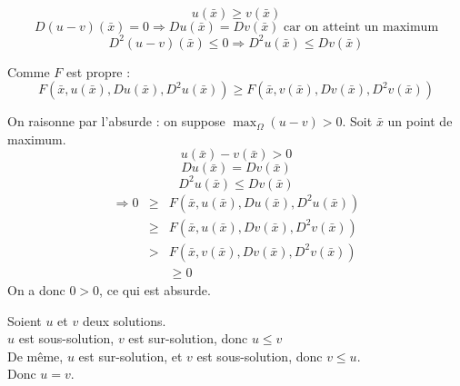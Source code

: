 
\begin{dem}
\[u(\bar{x})\geq v(\bar{x})\]
\[D(u-v)(\bar{x})=0 \Rightarrow Du(\bar{x})=Dv(\bar{x}) \text{ car on atteint un maximum}\]
\[D^2(u-v)(\bar{x})\leq0 \Rightarrow D^2u(\bar{x})\leq Dv(\bar{x})\]

Comme $F$ est propre : \[F(\bar{x}, u(\bar{x}), Du(\bar{x}), D^2u(\bar{x}))\geq F(\bar{x}, v(\bar{x}), Dv(\bar{x}), D^2v(\bar{x}))\]
\end{dem}



\begin{dem}
On raisonne par l'absurde : on suppose $\max_\Omega (u-v)>0$. Soit $\bar{x}$ un point de maximum.\\
\[u(\bar{x})-v(\bar{x})>0\]
\[Du(\bar{x})=Dv(\bar{x}) \]
\[D^2u(\bar{x})\leq Dv(\bar{x})\]
\begin{eqnarray*}
\Rightarrow 0&\geq&F(\bar{x}, u(\bar{x}), Du(\bar{x}), D^2u(\bar{x}))\\
		&\geq& F(\bar{x}, u(\bar{x}), Dv(\bar{x}), D^2v(\bar{x}))\\
		&>& F(\bar{x}, v(\bar{x}), Dv(\bar{x}), D^2v(\bar{x}))\\
		& & \geq 0
\end{eqnarray*}
On a donc $0>0$, ce qui est absurde.
\end{dem}



\begin{dem}
Soient $u$ et $v$ deux solutions.\\
$u$ est sous-solution, $v$ est sur-solution, donc $u\leq v$\\
De même, $u$ est sur-solution, et $v$ est sous-solution, donc $v\leq u$.\\
Donc $u=v$.
\end{dem}

